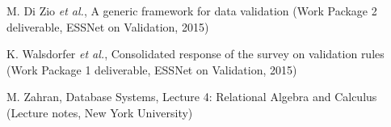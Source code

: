 M. Di Zio {\em et al.},
A generic framework for data validation
(Work Package 2 deliverable, ESSNet on Validation, 2015)

K. Walsdorfer {\em et al.},
Consolidated response of the survey on validation rules
(Work Package 1 deliverable, ESSNet on Validation, 2015)

M. Zahran,
Database Systems, Lecture 4: Relational Algebra and Calculus
(Lecture notes, New York University)